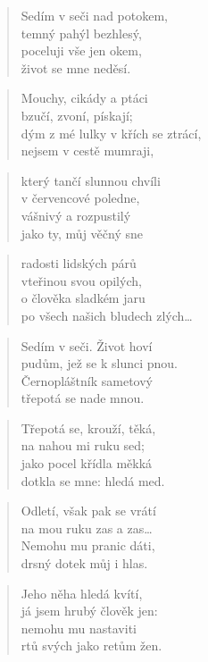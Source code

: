 \documentclass{book}
\begin{document}
\newpage
{}
\begin{verse}
Sedím v seči nad potokem,\\
temný pahýl bezhlesý,\\
poceluji vše jen okem,\\
život se mne neděsí.
\end{verse}
\begin{verse}
Mouchy, cikády a ptáci\\
bzučí, zvoní, pískají;\\
dým z mé lulky v křích se ztrácí,\\
nejsem v cestě mumraji,
\end{verse}
\begin{verse}
který tančí slunnou chvíli\\
v červencové poledne,\\
vášnivý a rozpustilý\\
jako ty, můj věčný sne
\end{verse}
\begin{verse}
radosti lidských párů\\
vteřinou svou opilých,\\
o člověka sladkém jaru\\
po všech našich bludech zlých\ldots
\end{verse}
\begin{verse}
Sedím v seči. Život hoví\\
pudům, jež se k slunci pnou.\\
Černopláštník sametový\\
třepotá se nade mnou.
\end{verse}
\begin{verse}
Třepotá se, krouží, těká,\\
na nahou mi ruku sed;\\
jako pocel křídla měkká\\
dotkla se mne: hledá med.
\end{verse}
\begin{verse}
Odletí, však pak se vrátí\\
na mou ruku zas a zas\ldots\\
Nemohu mu pranic dáti,\\
drsný dotek můj i hlas.
\end{verse}
\begin{verse}
Jeho něha hledá kvítí,\\
já jsem hrubý člověk jen:\\
nemohu mu nastaviti\\
rtů svých jako retům žen.
\end{verse}
\end{document}
